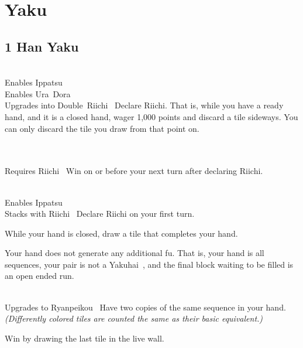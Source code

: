 \section{Yaku}\label{core:sec:yaku}

\subsection{1 Han Yaku}\label{core:ssec:1-han-yaku}

	{\closedhand \\ 
	\upgradesto Enables Ippatsu~ \\ 
	\upgradestoother Enables Ura~Dora~ \\ 
	\upgradesto Upgrades into Double~Riichi~}
	{Declare Riichi. That is, while you have a ready hand, and it is a closed hand, wager 1,000 points and discard a tile sideways. You can only discard the tile you draw from that point on.}

	{\closedhand \\ 
	\brokenhand \\
	\upgradesfrom Requires Riichi~}
	{Win on or before your next turn after declaring Riichi.}

	{\closedhand \\ 
	\upgradesto Enables Ippatsu~ \\ 
	\upgradesfrom Stacks with Riichi~}
	{Declare Riichi on your first turn.}

	{\closedhand}
	{While your hand is closed, draw a tile that completes your hand.}

	{\closedhand}
	{Your hand does not generate any additional fu. That is, your hand is all sequences, your pair is not a Yakuhai~, and the final block waiting to be filled is an open ended run.}

	{\closedhand \\
	\upgradesto Upgrades to Ryanpeikou~}
	{Have two copies of the same sequence in your hand. \textit{(Differently colored tiles are counted the same as their basic equivalent.)}}

	{}
	{Win by drawing the last tile in the live wall.}

